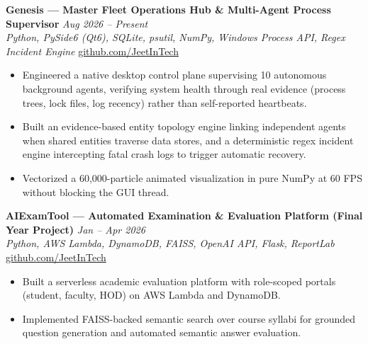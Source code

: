 \documentclass[9.5pt]{article}
\begin{document}
\vspace{2pt}
\textbf{Genesis — Master Fleet Operations Hub \& Multi-Agent Process Supervisor} \hfill \textit{Aug 2026 -- Present} \\
\textit{Python, PySide6 (Qt6), SQLite, psutil, NumPy, Windows Process API, Regex Incident Engine} \hfill \href{https://github.com/JeetInTech}{github.com/JeetInTech}
\begin{itemize}
  \item Engineered a native desktop control plane supervising 10 autonomous background agents, verifying system health through real evidence (process trees, lock files, log recency) rather than self-reported heartbeats.
  \item Built an evidence-based entity topology engine linking independent agents when shared entities traverse data stores, and a deterministic regex incident engine intercepting fatal crash logs to trigger automatic recovery.
  \item Vectorized a 60,000-particle animated visualization in pure NumPy at 60 FPS without blocking the GUI thread.
\end{itemize}

\vspace{2pt}
\textbf{AIExamTool — Automated Examination \& Evaluation Platform (Final Year Project)} \hfill \textit{Jan -- Apr 2026} \\
\textit{Python, AWS Lambda, DynamoDB, FAISS, OpenAI API, Flask, ReportLab} \hfill \href{https://github.com/JeetInTech}{github.com/JeetInTech}
\begin{itemize}
  \item Built a serverless academic evaluation platform with role-scoped portals (student, faculty, HOD) on AWS Lambda and DynamoDB.
  \item Implemented FAISS-backed semantic search over course syllabi for grounded question generation and automated semantic answer evaluation.
\end{itemize}

\end{document}
